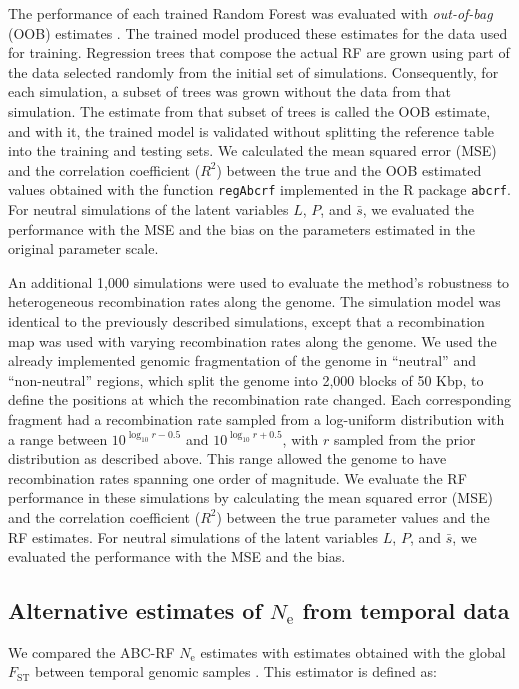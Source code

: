 \documentclass[a4paper, 12pt]{article}
\begin{document}
The performance of each trained Random Forest was evaluated with \textit{out-of-bag} (OOB) estimates \citep{Breiman:2001fb}. The trained model produced these estimates for the data used for training. Regression trees that compose the actual RF are grown using part of the data selected randomly from the initial set of simulations. Consequently, for each simulation, a subset of trees was grown without the data from that simulation. The estimate from that subset of trees is called the OOB estimate, and with it, the trained model is validated without splitting the reference table into the training and testing sets. We calculated the mean squared error (MSE) and the correlation coefficient ($R^2$) between the true and the OOB estimated values obtained with the function \texttt{regAbcrf} implemented in the R package \texttt{abcrf}. For neutral simulations of the latent variables $L$, $P$, and $\bar{s}$, we evaluated the performance with the MSE and the bias on the parameters estimated in the original parameter scale.

An additional 1,000 simulations were used to evaluate the method's robustness to heterogeneous recombination rates along the genome. The simulation model was identical to the previously described simulations, except that a recombination map was used with varying recombination rates along the genome. We used the already implemented genomic fragmentation of the genome in ``neutral'' and ``non-neutral'' regions, which split the genome into 2,000 blocks of 50 Kbp, to define the positions at which the recombination rate changed. Each corresponding fragment had a recombination rate sampled from a log-uniform distribution with a range between $10^{\log_{10}r - 0.5}$ and $10^{\log_{10}r + 0.5}$, with $r$ sampled from the prior distribution as described above. This range allowed the genome to have recombination rates spanning one order of magnitude. We evaluate the RF performance in these simulations by calculating the mean squared error (MSE) and the correlation coefficient ($R^2$) between the true parameter values and the RF estimates. For neutral simulations of the latent variables $L$, $P$, and $\bar{s}$, we evaluated the performance with the MSE and the bias.

\subsection*{Alternative estimates of $N_\mathrm{e}$ from temporal data}

We compared the ABC-RF $N_\mathrm{e}$ estimates with estimates obtained with the global $F_\mathrm{ST}$ between temporal genomic samples \citep{Frachon:2017fw}. This estimator is defined as:
\end{document}
